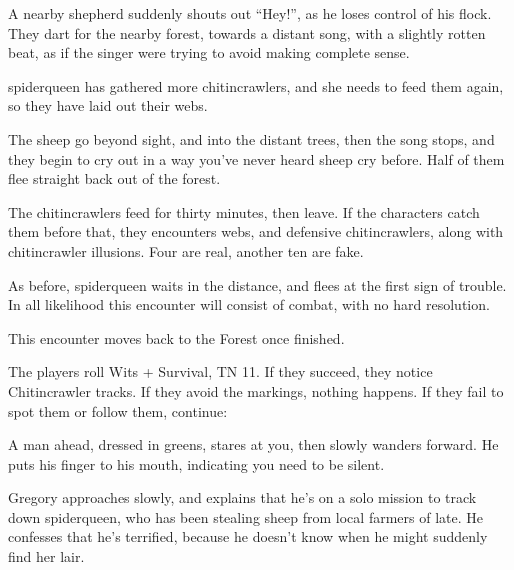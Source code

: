 \begin{multicols}{2}

\begin{boxtext}

	A nearby shepherd suddenly shouts out ``Hey!'', as he loses control of his flock.  They dart for the nearby forest, towards a distant song, with a slightly rotten beat, as if the singer were trying to avoid making complete sense.

\end{boxtext}

\Gls{spiderqueen} has gathered more chitincrawlers, and she needs to feed them again, so they have laid out their webs.

\begin{boxtext}

	The sheep go beyond sight, and into the distant trees, then the song stops, and they begin to cry out in a way you've never heard sheep cry before.  Half of them flee straight back out of the forest.

\end{boxtext}

The chitincrawlers feed for thirty minutes, then leave.  If the characters catch them before that, they encounters webs, and defensive chitincrawlers, along with chitincrawler illusions.  Four are real, another ten are fake.

As before, \gls{spiderqueen} waits in the distance, and flees at the first sign of trouble.  In all likelihood this encounter will consist of combat, with no hard resolution.

This encounter moves back to the Forest once finished.


The players roll Wits + Survival, TN 11.  If they succeed, they notice Chitincrawler tracks.  If they avoid the markings, nothing happens.  If they fail to spot them or follow them, continue:

\begin{boxtext}

	A man ahead, dressed in greens, stares at you, then slowly wanders forward.  He puts his finger to his mouth, indicating you need to be silent.

\end{boxtext}

Gregory approaches slowly, and explains that he's on a solo mission to track down \gls{spiderqueen}, who has been stealing sheep from local farmers of late.  He confesses that he's terrified, because he doesn't know when he might suddenly find her lair.


\end{multicols}
